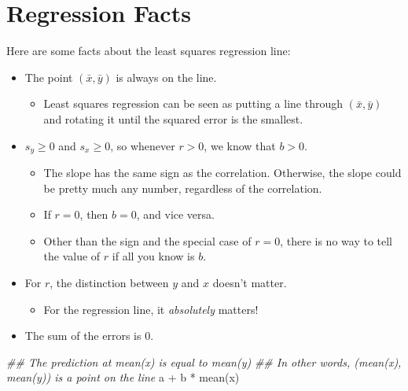 \documentclass[
  letterpaper,
  DIV=11,
  numbers=noendperiod,
  oneside]{scrreprt}
\newenvironment{Shaded}{\begin{snugshade}}{\end{snugshade}}
\newcommand{\DocumentationTok}[1]{\textcolor[rgb]{0.37,0.37,0.37}{\textit{#1}}}
\newcommand{\FunctionTok}[1]{\textcolor[rgb]{0.28,0.35,0.67}{#1}}
\newcommand{\NormalTok}[1]{\textcolor[rgb]{0.00,0.23,0.31}{#1}}
\newcommand{\SpecialCharTok}[1]{\textcolor[rgb]{0.37,0.37,0.37}{#1}}
\providecommand{\tightlist}{%
  \setlength{\itemsep}{0pt}\setlength{\parskip}{0pt}}\usepackage{longtable,booktabs,array}
\begin{document}
\hypertarget{regression-facts}{%
\section{Regression Facts}\label{regression-facts}}

Here are some facts about the least squares regression line:

\begin{itemize}
\tightlist
\item
  The point \((\bar x, \bar y)\) is always on the line.

  \begin{itemize}
  \tightlist
  \item
    Least squares regression can be seen as putting a line through
    \((\bar x, \bar y)\) and rotating it until the squared error is the
    smallest.
  \end{itemize}
\item
  \(s_y\ge 0\) and \(s_x\ge 0\), so whenever \(r > 0\), we know that
  \(b > 0\).

  \begin{itemize}
  \tightlist
  \item
    The slope has the same sign as the correlation. Otherwise, the slope
    could be pretty much any number, regardless of the correlation.
  \item
    If \(r = 0\), then \(b = 0\), and vice versa.
  \item
    Other than the sign and the special case of \(r=0\), there is no way
    to tell the value of \(r\) if all you know is \(b\).
  \end{itemize}
\item
  For \(r\), the distinction between \(y\) and \(x\) doesn't matter.

  \begin{itemize}
  \tightlist
  \item
    For the regression line, it \emph{absolutely} matters!
  \end{itemize}
\item
  The sum of the errors is 0.
\end{itemize}

\begin{Shaded}
\begin{Highlighting}[]
\DocumentationTok{\#\# The prediction at mean(x) is equal to mean(y)}
\DocumentationTok{\#\# In other words, (mean(x), mean(y)) is a point on the line}
\NormalTok{a }\SpecialCharTok{+}\NormalTok{ b }\SpecialCharTok{*} \FunctionTok{mean}\NormalTok{(x)}
\end{Highlighting}
\end{Shaded}
\end{document}
